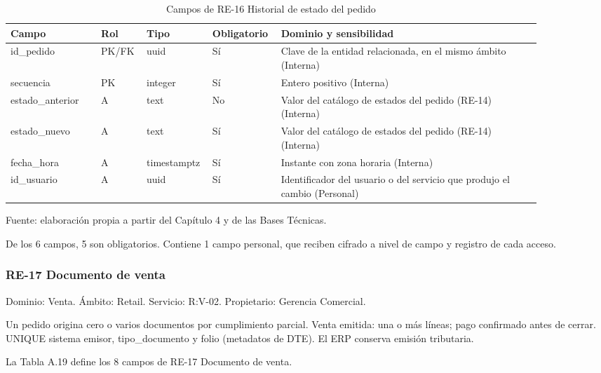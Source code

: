 \documentclass[11pt]{article}
\begin{document}
\begin{table}[htbp]
\caption{Campos de RE-16 Historial de estado del pedido}\label{tab:d_re16}
\centering
\begin{tabular}{@{}p{0.167\linewidth}p{0.070\linewidth}p{0.079\linewidth}p{0.097\linewidth}p{0.465\linewidth}@{}}
\toprule Campo & Rol & Tipo & Obligatorio & Dominio y sensibilidad \\
\midrule
id\_pedido & PK/FK & uuid & Sí & Clave de la entidad relacionada, en el mismo ámbito (Interna) \\
secuencia & PK & integer & Sí & Entero positivo (Interna) \\
estado\_anterior & A & text & No & Valor del catálogo de estados del pedido (RE-14) (Interna) \\
estado\_nuevo & A & text & Sí & Valor del catálogo de estados del pedido (RE-14) (Interna) \\
fecha\_hora & A & timestamptz & Sí & Instante con zona horaria (Interna) \\
id\_usuario & A & uuid & Sí & Identificador del usuario o del servicio que produjo el cambio (Personal) \\
\bottomrule
\end{tabular}
\par\smallskip
{\raggedright Fuente: elaboración propia a partir del Capítulo 4 y de las Bases Técnicas.\par}
\end{table}


De los 6 campos, 5 son obligatorios. Contiene 1 campo personal, que reciben cifrado a nivel de campo y registro de cada acceso.

\subsubsection{RE-17 Documento de venta}

Dominio: Venta. Ámbito: Retail. Servicio: R:V-02. Propietario: Gerencia Comercial.

Un pedido origina cero o varios documentos por cumplimiento parcial. Venta emitida: una o más líneas; pago confirmado antes de cerrar. UNIQUE sistema emisor, tipo\_documento y folio (metadatos de DTE). El ERP conserva emisión tributaria.

La Tabla A.19 define los 8 campos de RE-17 Documento de venta.
\end{document}
